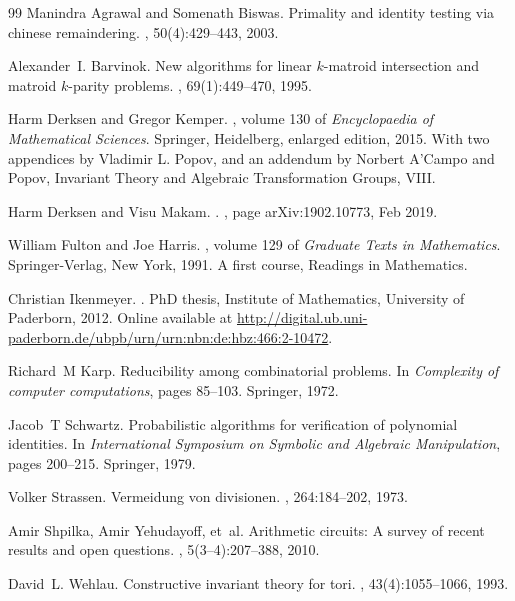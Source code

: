 \documentclass[10pt,a4paper]{article}
\begin{document}
\begin{thebibliography}{99}
Manindra Agrawal and Somenath Biswas.
\newblock Primality and identity testing via chinese remaindering.
, 50(4):429--443, 2003.

Alexander~I. Barvinok.
\newblock New algorithms for linear $k$-matroid intersection and matroid
  $k$-parity problems.
, 69(1):449--470, 1995.

Harm Derksen and Gregor Kemper.
, volume 130 of {\em
  Encyclopaedia of Mathematical Sciences}.
\newblock Springer, Heidelberg, enlarged edition, 2015.
\newblock With two appendices by Vladimir L. Popov, and an addendum by Norbert
  A'Campo and Popov, Invariant Theory and Algebraic Transformation Groups,
  VIII.

Harm {Derksen} and Visu {Makam}.
.
, page arXiv:1902.10773, Feb 2019.

William Fulton and Joe Harris.
, volume 129 of {\em Graduate Texts in
  Mathematics}.
\newblock Springer-Verlag, New York, 1991.
\newblock A first course, Readings in Mathematics.

Christian Ikenmeyer.
.
\newblock PhD thesis, Institute of Mathematics, University of Paderborn, 2012.
\newblock Online available at
  \url{http://digital.ub.uni-paderborn.de/ubpb/urn/urn:nbn:de:hbz:466:2-10472}.

Richard~M Karp.
\newblock Reducibility among combinatorial problems.
\newblock In {\em Complexity of computer computations}, pages 85--103.
  Springer, 1972.

Jacob~T Schwartz.
\newblock Probabilistic algorithms for verification of polynomial identities.
\newblock In {\em International Symposium on Symbolic and Algebraic
  Manipulation}, pages 200--215. Springer, 1979.

Volker Strassen.
\newblock Vermeidung von divisionen.
,
  264:184--202, 1973.

Amir Shpilka, Amir Yehudayoff, et~al.
\newblock Arithmetic circuits: A survey of recent results and open questions.
, 5(3--4):207--388, 2010.

David~L. Wehlau.
\newblock Constructive invariant theory for tori.
, 43(4):1055--1066, 1993.

\end{thebibliography}
\end{document}
